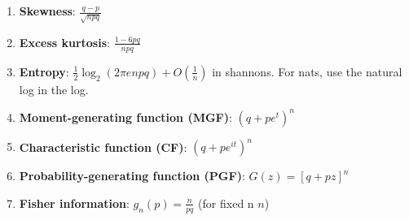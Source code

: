 \begin{enumerate}
        

    \item \textbf{Skewness}:
    $
         {\displaystyle {\frac {q-p}{\sqrt {npq}}}}
    $
    \hfill \cite{wiki/Binomial_distribution}

    \item \textbf{Excess kurtosis}: 
    $
         {\displaystyle {\frac {1-6pq}{npq}}}
    $
    \hfill \cite{wiki/Binomial_distribution}

    \item \textbf{Entropy}: 
     ${\displaystyle {\frac {1}{2}}\log _{2}(2\pi enpq)+O\left({\frac {1}{n}}\right)}$ in shannons. For nats, use the natural log in the log.
    \hfill \cite{wiki/Binomial_distribution}

    \item \textbf{Moment-generating function (MGF)}: 
    $
         {\displaystyle (q+pe^{t})^{n}}
    $
    \hfill \cite{wiki/Binomial_distribution}
    
    \item \textbf{Characteristic function (CF)}:
    $   
         {\displaystyle (q+pe^{it})^{n}}
    $
    \hfill \cite{wiki/Binomial_distribution}

    \item \textbf{Probability-generating function (PGF)}:
    $
         {\displaystyle G(z)=[q+pz]^{n}}
    $
    \hfill \cite{wiki/Binomial_distribution}

    \item \textbf{Fisher information}:
    ${\displaystyle g_{n}(p)={\frac {n}{pq}}}$ (for fixed n ${\displaystyle n}$)
    \hfill \cite{wiki/Binomial_distribution}
\end{enumerate}





